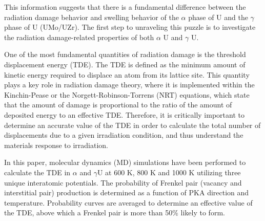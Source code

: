 \documentclass[review]{elsarticle}
\begin{document}
This information suggests that there is a fundamental difference between the radiation damage behavior and swelling behavior of the $\alpha$ phase of U and the $\gamma$ phase of U (UMo/UZr). The first step to unraveling this puzzle is to investigate the radiation damage-related properties of both $\alpha$ U and $\gamma$ U.

One of the most fundamental quantities of radiation damage is the threshold displacement energy (TDE). The TDE is defined as the minimum amount of kinetic energy required to displace an atom from its lattice site. This quantity plays a key role in radiation damage theory, where it is implemented within the Kinchin-Pease \cite{kinchinpease} or the Norgett-Robinson-Torrens (NRT) \cite{norgett1975} equations, which state that the amount of damage is proportional to the ratio of the amount of deposited energy to an effective TDE. Therefore, it is critically important to determine an accurate value of the TDE in order to calculate the total number of displacements due to a given irradiation condition, and thus understand the materials response to irradiation.

In this paper, molecular dynamics (MD) simulations have been performed to calculate the TDE in $\alpha$ and $\gamma$U at 600 K, 800 K and 1000 K utilizing three unique interatomic potentials. The probability of Frenkel pair (vacancy and interstitial pair) production is determined as a function of PKA direction and temperature. Probability curves are averaged to determine an effective value of the TDE, above which a Frenkel pair is more than 50$\%$ likely to form. 
\end{document}
